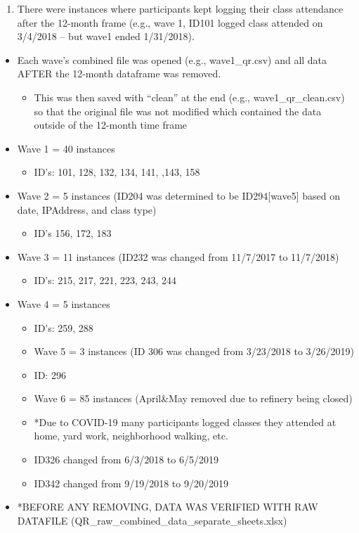\documentclass[
]{book}
\providecommand{\tightlist}{%
  \setlength{\itemsep}{0pt}\setlength{\parskip}{0pt}}
\begin{document}
\begin{enumerate}
\def\labelenumi{\arabic{enumi}.}
\setcounter{enumi}{6}
\tightlist
\item
  There were instances where participants kept logging their class attendance after the 12-month frame (e.g., wave 1, ID101 logged class attended on 3/4/2018 -- but wave1 ended 1/31/2018).
\end{enumerate}

\begin{itemize}
\tightlist
\item
  Each wave's combined file was opened (e.g., wave1\_qr.csv) and all data AFTER the 12-month dataframe was removed.

  \begin{itemize}
  \tightlist
  \item
    This was then saved with ``clean'' at the end (e.g., wave1\_qr\_clean.csv) so that the original file was not modified which contained the data outside of the 12-month time frame
  \end{itemize}
\item
  Wave 1 = 40 instances

  \begin{itemize}
  \tightlist
  \item
    ID's: 101, 128, 132, 134, 141, ,143, 158
  \end{itemize}
\item
  Wave 2 = 5 instances (ID204 was determined to be ID294{[}wave5{]} based on date, IPAddress, and class type)

  \begin{itemize}
  \tightlist
  \item
    ID's 156, 172, 183
  \end{itemize}
\item
  Wave 3 = 11 instances (ID232 was changed from 11/7/2017 to 11/7/2018)

  \begin{itemize}
  \tightlist
  \item
    ID's: 215, 217, 221, 223, 243, 244
  \end{itemize}
\item
  Wave 4 = 5 instances

  \begin{itemize}
  \tightlist
  \item
    ID's: 259, 288
  \item
    Wave 5 = 3 instances (ID 306 was changed from 3/23/2018 to 3/26/2019)
  \item
    ID: 296
  \item
    Wave 6 = 85 instances (April\&May removed due to refinery being closed)
  \item
    *Due to COVID-19 many participants logged classes they attended at home, yard work, neighborhood walking, etc.
  \item
    ID326 changed from 6/3/2018 to 6/5/2019
  \item
    ID342 changed from 9/19/2018 to 9/20/2019
  \end{itemize}
\item
  *BEFORE ANY REMOVING, DATA WAS VERIFIED WITH RAW DATAFILE (QR\_raw\_combined\_data\_separate\_sheets.xlsx)
\end{itemize}
\end{document}
